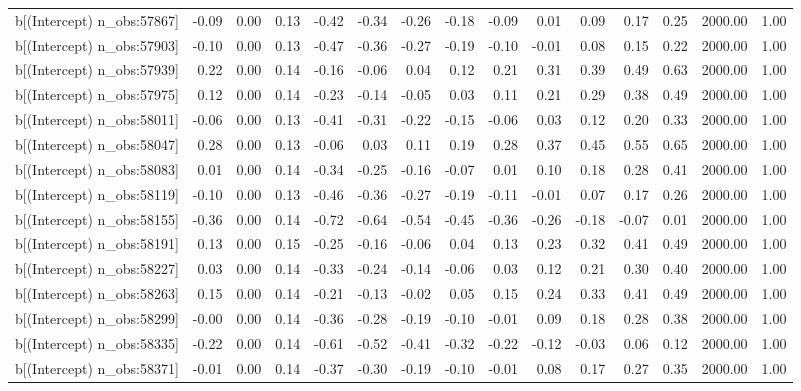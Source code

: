 \begin{table}[ht]
\begin{tabular}{rrrrrrrrrrrrrrr}
  b[(Intercept) n\_obs:57867] & -0.09 & 0.00 & 0.13 & -0.42 & -0.34 & -0.26 & -0.18 & -0.09 & 0.01 & 0.09 & 0.17 & 0.25 & 2000.00 & 1.00 \\ 
  b[(Intercept) n\_obs:57903] & -0.10 & 0.00 & 0.13 & -0.47 & -0.36 & -0.27 & -0.19 & -0.10 & -0.01 & 0.08 & 0.15 & 0.22 & 2000.00 & 1.00 \\ 
  b[(Intercept) n\_obs:57939] & 0.22 & 0.00 & 0.14 & -0.16 & -0.06 & 0.04 & 0.12 & 0.21 & 0.31 & 0.39 & 0.49 & 0.63 & 2000.00 & 1.00 \\ 
  b[(Intercept) n\_obs:57975] & 0.12 & 0.00 & 0.14 & -0.23 & -0.14 & -0.05 & 0.03 & 0.11 & 0.21 & 0.29 & 0.38 & 0.49 & 2000.00 & 1.00 \\ 
  b[(Intercept) n\_obs:58011] & -0.06 & 0.00 & 0.13 & -0.41 & -0.31 & -0.22 & -0.15 & -0.06 & 0.03 & 0.12 & 0.20 & 0.33 & 2000.00 & 1.00 \\ 
  b[(Intercept) n\_obs:58047] & 0.28 & 0.00 & 0.13 & -0.06 & 0.03 & 0.11 & 0.19 & 0.28 & 0.37 & 0.45 & 0.55 & 0.65 & 2000.00 & 1.00 \\ 
  b[(Intercept) n\_obs:58083] & 0.01 & 0.00 & 0.14 & -0.34 & -0.25 & -0.16 & -0.07 & 0.01 & 0.10 & 0.18 & 0.28 & 0.41 & 2000.00 & 1.00 \\ 
  b[(Intercept) n\_obs:58119] & -0.10 & 0.00 & 0.13 & -0.46 & -0.36 & -0.27 & -0.19 & -0.11 & -0.01 & 0.07 & 0.17 & 0.26 & 2000.00 & 1.00 \\ 
  b[(Intercept) n\_obs:58155] & -0.36 & 0.00 & 0.14 & -0.72 & -0.64 & -0.54 & -0.45 & -0.36 & -0.26 & -0.18 & -0.07 & 0.01 & 2000.00 & 1.00 \\ 
  b[(Intercept) n\_obs:58191] & 0.13 & 0.00 & 0.15 & -0.25 & -0.16 & -0.06 & 0.04 & 0.13 & 0.23 & 0.32 & 0.41 & 0.49 & 2000.00 & 1.00 \\ 
  b[(Intercept) n\_obs:58227] & 0.03 & 0.00 & 0.14 & -0.33 & -0.24 & -0.14 & -0.06 & 0.03 & 0.12 & 0.21 & 0.30 & 0.40 & 2000.00 & 1.00 \\ 
  b[(Intercept) n\_obs:58263] & 0.15 & 0.00 & 0.14 & -0.21 & -0.13 & -0.02 & 0.05 & 0.15 & 0.24 & 0.33 & 0.41 & 0.49 & 2000.00 & 1.00 \\ 
  b[(Intercept) n\_obs:58299] & -0.00 & 0.00 & 0.14 & -0.36 & -0.28 & -0.19 & -0.10 & -0.01 & 0.09 & 0.18 & 0.28 & 0.38 & 2000.00 & 1.00 \\ 
  b[(Intercept) n\_obs:58335] & -0.22 & 0.00 & 0.14 & -0.61 & -0.52 & -0.41 & -0.32 & -0.22 & -0.12 & -0.03 & 0.06 & 0.12 & 2000.00 & 1.00 \\ 
  b[(Intercept) n\_obs:58371] & -0.01 & 0.00 & 0.14 & -0.37 & -0.30 & -0.19 & -0.10 & -0.01 & 0.08 & 0.17 & 0.27 & 0.35 & 2000.00 & 1.00 \\ 

\end{tabular}
\end{table}
